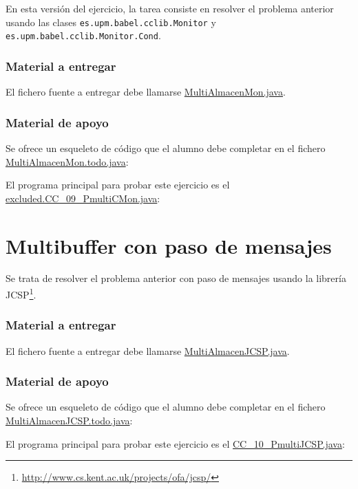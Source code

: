 \documentclass{article}
\begin{document}

En esta versión del ejercicio, la tarea consiste en resolver
el problema anterior usando las clases
\lstinline{es.upm.babel.cclib.Monitor} y
\lstinline{es.upm.babel.cclib.Monitor.Cond}.

\subsubsection*{Material a entregar}
El fichero fuente a entregar debe llamarse \url{MultiAlmacenMon.java}.

\subsubsection*{Material de apoyo}%
Se ofrece un esqueleto de código que el alumno debe completar en el fichero
\url{MultiAlmacenMon.todo.java}:


El programa principal para probar este ejercicio es el
\url{excluded.CC_09_PmultiCMon.java}:


\clearpage
\section{Multibuffer con paso de mensajes}
Se trata de resolver el problema anterior con paso de mensajes usando
la librería
JCSP\footnote{\url{http://www.cs.kent.ac.uk/projects/ofa/jcsp/}}.

\subsubsection*{Material a entregar}
El fichero fuente a entregar debe llamarse \url{MultiAlmacenJCSP.java}.

\subsubsection*{Material de apoyo}%
Se ofrece un esqueleto de código que el alumno debe completar en el fichero
\url{MultiAlmacenJCSP.todo.java}:


El programa principal para probar este ejercicio es el
\url{CC_10_PmultiJCSP.java}: 

\end{document}
